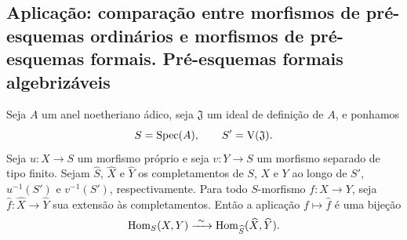 \subsection{Aplicação: comparação entre morfismos de pré-esquemas ordinários e morfismos de pré-esquemas formais. Pré-esquemas formais algebrizáveis}
\label{subsection:III.5.4}

\begin{theorem}[5.4.1]
\label{III.5.4.1}
Seja $A$ um anel noetheriano ádico, seja $\mathfrak{J}$ um ideal
de definição de $A$, e ponhamos
\[
  S=\operatorname{Spec}(A),\qquad S'=\mathrm{V}(\mathfrak{J}).
\]
Seja $u:X\to S$ um morfismo próprio e seja $v:Y\to S$ um
morfismo separado de tipo finito. Sejam
$\widehat{S}$, $\widehat{X}$ e $\widehat{Y}$ os completamentos
de $S$, $X$ e $Y$ ao longo de $S'$, $u^{-1}(S')$ e $v^{-1}(S')$,
respectivamente. Para todo $S$-morfismo $f:X\to Y$, seja
$\widehat{f}:\widehat{X}\to\widehat{Y}$ sua extensão às
completamentos. Então a aplicação $f\mapsto\widehat{f}$ é uma bijeção
\[
  \operatorname{Hom}_S(X,Y)
  \xrightarrow{\ \sim\ }
  \operatorname{Hom}_{\widehat{S}}(\widehat{X},\widehat{Y}).
\]
\end{theorem}

